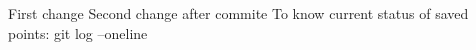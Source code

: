 First change
Second change
after commite 
To know current status of saved points: git log --oneline

